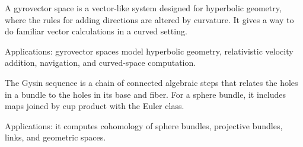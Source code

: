 A gyrovector space is a vector-like system designed for hyperbolic geometry, where the rules for adding directions are altered by curvature. It gives a way to do familiar vector calculations in a curved setting. \par\noindent Applications: gyrovector spaces model hyperbolic geometry, relativistic velocity addition, navigation, and curved-space computation.

The Gysin sequence is a chain of connected algebraic steps that relates the holes in a bundle to the holes in its base and fiber. For a sphere bundle, it includes maps joined by cup product with the Euler class. \par\noindent Applications: it computes cohomology of sphere bundles, projective bundles, links, and geometric spaces.
